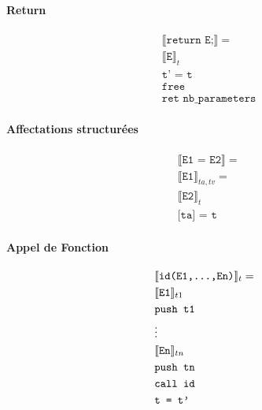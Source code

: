 \documentclass[12pt,twocolumn]{report}
\begin{document}
\begin{trad}
    \paragraph*{Return}
    \begin{align*}
        &\llbracket \texttt{return E;} \rrbracket= \\
        &\llbracket \texttt{E} \rrbracket_{t} \\
        &\texttt{t' = t} \\
        &\texttt{free}\\
        &\texttt{ret nb\_parameters} 
    \end{align*}
\end{trad}
\begin{trad}
    \paragraph*{Affectations structurées}
    \begin{align*}
        &\llbracket \texttt{E1 = E2} \rrbracket= \\
        &\llbracket \texttt{E1} \rrbracket_{ta,tv}= \\
        &\llbracket \texttt{E2} \rrbracket_{t}\\
        &\texttt{[ta] = t} 
    \end{align*}
\end{trad}
\begin{trad}
    \paragraph*{Appel de Fonction}
    \begin{align*}
        &\llbracket \texttt{id(E1,\dots,En)} \rrbracket_t= \\
        &\llbracket \texttt{E1} \rrbracket_{t1} \\
        &\texttt{push t1} \\
        &\vdots\\
        &\llbracket \texttt{En} \rrbracket_{tn}\\
        &\texttt{push tn} \\
        &\texttt{call id}\\
        &\texttt{t = t'}
    \end{align*}
\end{trad}
\end{document}
